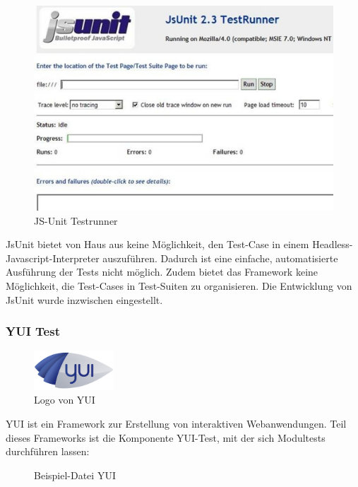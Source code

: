 \begin{figure}[H]
	\begin{center}
		\includegraphics[width=12cm]{bilder/jsunit-testrunner}
		\caption{JS-Unit Testrunner}
		\label{image:jsunit-testrunner}
	\end{center}
\end{figure}

JsUnit bietet von Haus aus keine Möglichkeit, den Test-Case in einem Headless- Javascript-Interpreter auszuführen. Dadurch ist eine einfache, automatisierte Ausführung der Tests nicht möglich. Zudem bietet das Framework keine Möglichkeit, die Test-Cases in Test-Suiten zu organisieren. Die Entwicklung von JsUnit wurde inzwischen eingestellt.

\subsubsection{YUI Test}

\begin{figure}[H]
	\begin{center}
	\includegraphics[width=3cm]{bilder/yui}
		\caption{Logo von YUI}
		\label{image:yui}
	\end{center}
\end{figure}

YUI ist ein Framework zur Erstellung von interaktiven Webanwendungen. Teil dieses Frameworks ist die Komponente YUI-Test, mit der sich Modultests durchführen lassen:

\begin{figure}[H]
	\caption{Beispiel-Datei YUI}
	\label{code:yui}
\end{figure}

